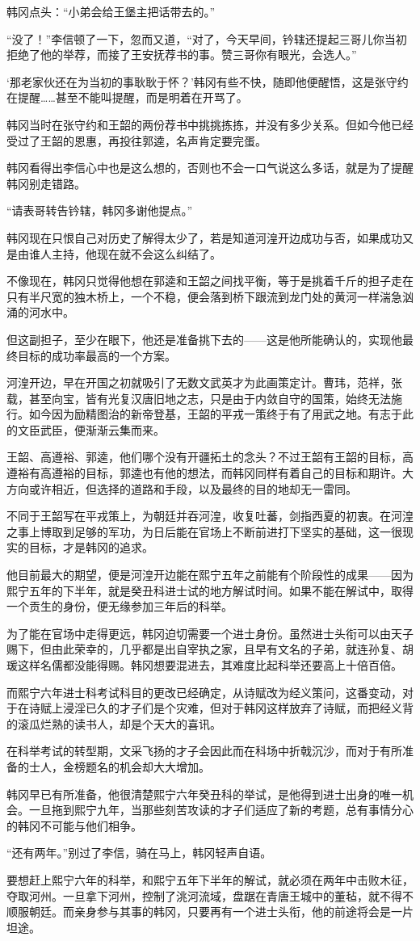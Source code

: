 韩冈点头：“小弟会给王堡主把话带去的。”

“没了！”李信顿了一下，忽而又道，“对了，今天早间，钤辖还提起三哥儿你当初拒绝了他的举荐，而接了王安抚荐书的事。赞三哥你有眼光，会选人。”

‘那老家伙还在为当初的事耿耿于怀？’韩冈有些不快，随即他便醒悟，这是张守约在提醒……甚至不能叫提醒，而是明着在开骂了。

韩冈当时在张守约和王韶的两份荐书中挑挑拣拣，并没有多少关系。但如今他已经受过了王韶的恩惠，再投往郭逵，名声肯定要完蛋。

韩冈看得出李信心中也是这么想的，否则也不会一口气说这么多话，就是为了提醒韩冈别走错路。

“请表哥转告钤辖，韩冈多谢他提点。”

韩冈现在只恨自己对历史了解得太少了，若是知道河湟开边成功与否，如果成功又是由谁人主持，他现在就不会这么纠结了。

不像现在，韩冈只觉得他想在郭逵和王韶之间找平衡，等于是挑着千斤的担子走在只有半尺宽的独木桥上，一个不稳，便会落到桥下跟流到龙门处的黄河一样湍急汹涌的河水中。

但这副担子，至少在眼下，他还是准备挑下去的——这是他所能确认的，实现他最终目标的成功率最高的一个方案。

河湟开边，早在开国之初就吸引了无数文武英才为此画策定计。曹玮，范祥，张载，甚至向宝，皆有光复汉唐旧地之志，只是由于内敛自守的国策，始终无法施行。如今因为励精图治的新帝登基，王韶的平戎一策终于有了用武之地。有志于此的文臣武臣，便渐渐云集而来。

王韶、高遵裕、郭逵，他们哪个没有开疆拓土的念头？不过王韶有王韶的目标，高遵裕有高遵裕的目标，郭逵也有他的想法，而韩冈同样有着自己的目标和期许。大方向或许相近，但选择的道路和手段，以及最终的目的地却无一雷同。

不同于王韶写在平戎策上，为朝廷并吞河湟，收复吐蕃，剑指西夏的初衷。在河湟之事上博取到足够的军功，为日后能在官场上不断前进打下坚实的基础，这一很现实的目标，才是韩冈的追求。

他目前最大的期望，便是河湟开边能在熙宁五年之前能有个阶段性的成果——因为熙宁五年的下半年，就是癸丑科进士试的地方解试时间。如果不能在解试中，取得一个贡生的身份，便无缘参加三年后的科举。

为了能在官场中走得更远，韩冈迫切需要一个进士身份。虽然进士头衔可以由天子赐下，但由此荣幸的，几乎都是出自宰执之家，且早有文名的子弟，就连孙复、胡瑗这样名儒都没能得赐。韩冈想要混进去，其难度比起科举还要高上十倍百倍。

而熙宁六年进士科考试科目的更改已经确定，从诗赋改为经义策问，这番变动，对于在诗赋上浸淫已久的才子们是个灾难，但对于韩冈这样放弃了诗赋，而把经义背的滚瓜烂熟的读书人，却是个天大的喜讯。

在科举考试的转型期，文采飞扬的才子会因此而在科场中折戟沉沙，而对于有所准备的士人，金榜题名的机会却大大增加。

韩冈早已有所准备，他很清楚熙宁六年癸丑科的举试，是他得到进士出身的唯一机会。一旦拖到熙宁九年，当那些刻苦攻读的才子们适应了新的考题，总有事情分心的韩冈不可能与他们相争。

“还有两年。”别过了李信，骑在马上，韩冈轻声自语。

要想赶上熙宁六年的科举，和熙宁五年下半年的解试，就必须在两年中击败木征，夺取河州。一旦拿下河州，控制了洮河流域，盘踞在青唐王城中的董毡，就不得不顺服朝廷。而亲身参与其事的韩冈，只要再有一个进士头衔，他的前途将会是一片坦途。

